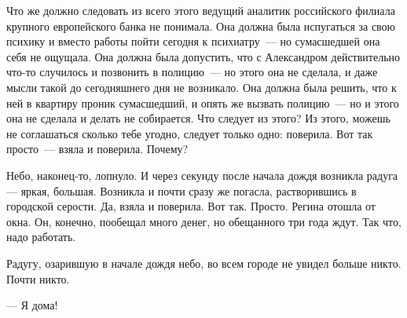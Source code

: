 Что же должно следовать из всего этого ведущий аналитик российского филиала 
крупного европейского банка не понимала. Она должна была испугаться за свою 
психику и вместо работы пойти сегодня к психиатру~--- но сумасшедшей она себя 
не ощущала. Она должна была допустить, что с Александром действительно что-то 
случилось и позвонить в полицию~--- но этого она не сделала, и даже мысли такой 
до сегодняшнего дня не возникало. Она должна была решить, что к ней в квартиру 
проник сумасшедший, и опять же вызвать полицию~--- но и этого она не сделала и 
делать не собирается. Что следует из этого? Из этого, можешь не соглашаться 
сколько тебе угодно, следует только одно: поверила. Вот так просто~--- взяла и 
поверила. Почему?

Небо, наконец-то, лопнуло. И через секунду после начала дождя возникла радуга 
--- яркая, большая. Возникла и почти сразу же погасла, растворившись в 
городской 
серости. Да, взяла и поверила. Вот так. Просто. Регина отошла от окна. Он, 
конечно, пообещал много денег, но обещанного три года ждут. Так что, надо 
работать.

Радугу, озарившую в начале дождя небо, во всем городе не увидел больше никто. 
Почти никто.

\newpage

\noindent --- Я дома!

